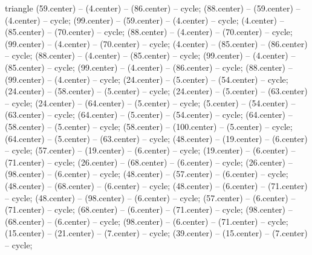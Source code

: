 {\begin{pgfonlayer}{triangle}
 (59.center) -- (4.center) -- (86.center) -- cycle; 
 (88.center) -- (59.center) -- (4.center) -- cycle; 
 (99.center) -- (59.center) -- (4.center) -- cycle; 
 (4.center) -- (85.center) -- (70.center) -- cycle; 
 (88.center) -- (4.center) -- (70.center) -- cycle; 
 (99.center) -- (4.center) -- (70.center) -- cycle; 
 (4.center) -- (85.center) -- (86.center) -- cycle; 
 (88.center) -- (4.center) -- (85.center) -- cycle; 
 (99.center) -- (4.center) -- (85.center) -- cycle; 
 (99.center) -- (4.center) -- (86.center) -- cycle; 
 (88.center) -- (99.center) -- (4.center) -- cycle; 
 (24.center) -- (5.center) -- (54.center) -- cycle; 
 (24.center) -- (58.center) -- (5.center) -- cycle; 
 (24.center) -- (5.center) -- (63.center) -- cycle; 
 (24.center) -- (64.center) -- (5.center) -- cycle; 
 (5.center) -- (54.center) -- (63.center) -- cycle; 
 (64.center) -- (5.center) -- (54.center) -- cycle; 
 (64.center) -- (58.center) -- (5.center) -- cycle; 
 (58.center) -- (100.center) -- (5.center) -- cycle; 
 (64.center) -- (5.center) -- (63.center) -- cycle; 
 (48.center) -- (19.center) -- (6.center) -- cycle; 
 (57.center) -- (19.center) -- (6.center) -- cycle; 
 (19.center) -- (6.center) -- (71.center) -- cycle; 
 (26.center) -- (68.center) -- (6.center) -- cycle; 
 (26.center) -- (98.center) -- (6.center) -- cycle; 
 (48.center) -- (57.center) -- (6.center) -- cycle; 
 (48.center) -- (68.center) -- (6.center) -- cycle; 
 (48.center) -- (6.center) -- (71.center) -- cycle; 
 (48.center) -- (98.center) -- (6.center) -- cycle; 
 (57.center) -- (6.center) -- (71.center) -- cycle; 
 (68.center) -- (6.center) -- (71.center) -- cycle; 
 (98.center) -- (68.center) -- (6.center) -- cycle; 
 (98.center) -- (6.center) -- (71.center) -- cycle; 
 (15.center) -- (21.center) -- (7.center) -- cycle; 
 (39.center) -- (15.center) -- (7.center) -- cycle; 

\end{pgfonlayer}}
